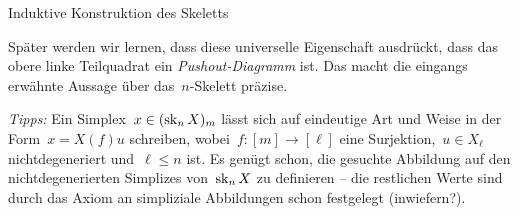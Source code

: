 \documentclass{uebblatt}
\begin{document}
\begin{aufgabe}{Induktive Konstruktion des Skeletts}
\begin{enumerate}
Später werden wir lernen, dass diese universelle Eigenschaft ausdrückt, dass
das obere linke Teilquadrat ein \emph{Pushout-Diagramm} ist. Das macht die
eingangs erwähnte Aussage über das~$n$-Skelett präzise.

\emph{Tipps:} Ein Simplex~$x \in (\operatorname{sk}_n X)_m$ lässt sich auf eindeutige Art und
Weise in der Form~$x = X(f)u$ schreiben, wobei~$f : [m] \to [\ell]$ eine
Surjektion,~$u \in X_\ell$ nichtdegeneriert und~$\ell \leq n$ ist. Es genügt
schon, die gesuchte Abbildung auf den nichtdegenerierten Simplizes von~$\operatorname{sk}_n
X$ zu definieren -- die restlichen Werte sind durch das Axiom an simpliziale
Abbildungen schon festgelegt (inwiefern?).
\end{enumerate}
\end{aufgabe}
\end{document}
